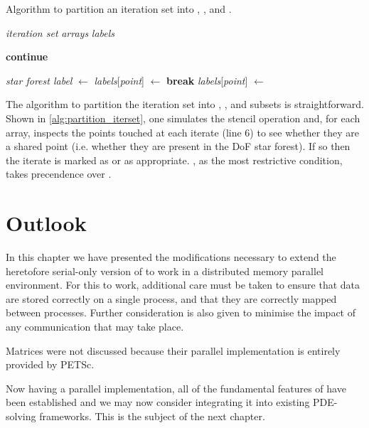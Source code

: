 \documentclass[thesis]{subfiles}
\begin{document}
\begin{algorithm}
  \caption{
    Algorithm to partition an iteration set into \coreiter{}, \rootiter{}, and \leafiter{}.
  }
  \begin{algorithmic}[1]
    \Require \textit{iteration set}
    \Require \textit{arrays} 
    \Require \textit{labels} 

       
         
          \State \textbf{continue}
        \EndIf

            \State \textit{star forest label} $\gets$ 
              \State \textit{labels}[\textit{point}] $\gets$ \leafiter{}
              \State \textbf{break} 
            \Else
              \State \textit{labels}[\textit{point}] $\gets$ \rootiter{}
            \EndIf
          \EndIf
        \EndFor
      \EndFor
    \EndFor
  \end{algorithmic}
  \label{alg:partition_iterset}
\end{algorithm}

The algorithm to partition the iteration set into \coreiter{}, \rootiter{}, and \leafiter{} subsets is straightforward.
Shown in \cref{alg:partition_iterset}, one simulates the stencil operation and, for each array, inspects the points touched at each iterate (line 6) to see whether they are a shared point (i.e. whether they are present in the DoF star forest).
If so then the iterate is marked as \rootiter{} or \leafiter{} as appropriate.
\leafiter{}, as the most restrictive condition, takes precendence over \rootiter{}.

\section{Outlook}

In this chapter we have presented the modifications necessary to extend the heretofore serial-only version of  to work in a distributed memory parallel environment.
For this to work, additional care must be taken to ensure that data are stored correctly on a single process, and that they are correctly mapped between processes.
Further consideration is also given to minimise the impact of any communication that may take place.

Matrices were not discussed because their parallel implementation is entirely provided by PETSc.

Now having a parallel implementation, all of the fundamental features of  have been established and we may now consider integrating it into existing PDE-solving frameworks.
This is the subject of the next chapter.
\end{document}
